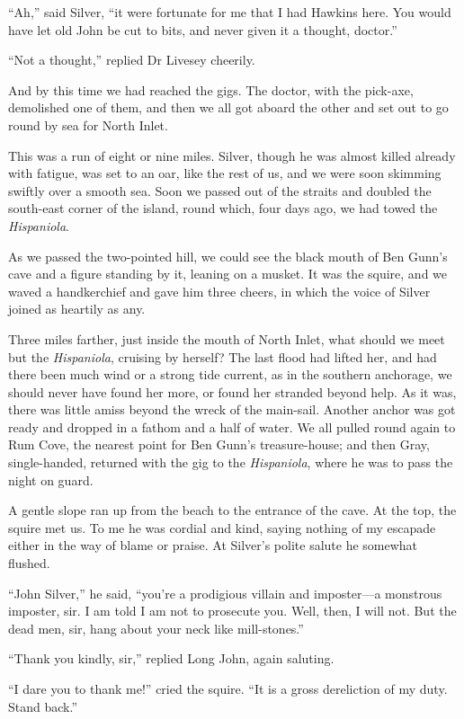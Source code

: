\enquote{Ah,} said Silver, \enquote{it were fortunate for me that I had Hawkins here. You would have let old John be cut to bits, and never given it a thought, doctor.}

\enquote{Not a thought,} replied Dr Livesey cheerily.

And by this time we had reached the gigs. The doctor, with the pick-axe, demolished one of them, and then we all got aboard the other and set out to go round by sea for North Inlet.

This was a run of eight or nine miles. Silver, though he was almost killed already with fatigue, was set to an oar, like the rest of us, and we were soon skimming swiftly over a smooth sea. Soon we passed out of the straits and doubled the south-east corner of the island, round which, four days ago, we had towed the \textit{Hispaniola}.

As we passed the two-pointed hill, we could see the black mouth of Ben Gunn’s cave and a figure standing by it, leaning on a musket. It was the squire, and we waved a handkerchief and gave him three cheers, in which the voice of Silver joined as heartily as any.

Three miles farther, just inside the mouth of North Inlet, what should we meet but the \textit{Hispaniola}, cruising by herself? The last flood had lifted her, and had there been much wind or a strong tide current, as in the southern anchorage, we should never have found her more, or found her stranded beyond help. As it was, there was little amiss beyond the wreck of the main-sail. Another anchor was got ready and dropped in a fathom and a half of water. We all pulled round again to Rum Cove, the nearest point for Ben Gunn’s treasure-house; and then Gray, single-handed, returned with the gig to the \textit{Hispaniola}, where he was to pass the night on guard.

A gentle slope ran up from the beach to the entrance of the cave. At the top, the squire met us. To me he was cordial and kind, saying nothing of my escapade either in the way of blame or praise. At Silver’s polite salute he somewhat flushed.

\enquote{John Silver,} he said, \enquote{you’re a prodigious villain and imposter---a monstrous imposter, sir. I am told I am not to prosecute you. Well, then, I will not. But the dead men, sir, hang about your neck like mill-stones.}

\enquote{Thank you kindly, sir,} replied Long John, again saluting.

\enquote{I dare you to thank me!} cried the squire. \enquote{It is a gross dereliction of my duty. Stand back.}

